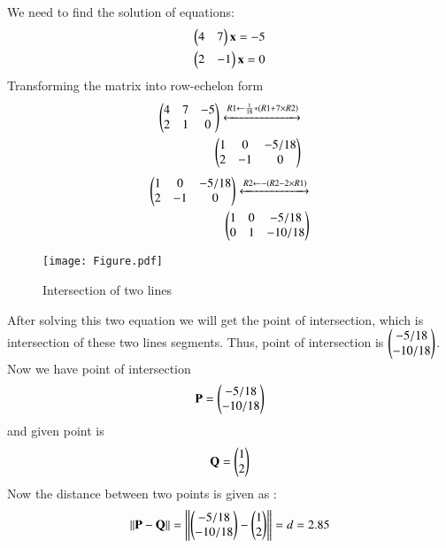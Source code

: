 \documentclass[journal,12pt,twocolumn]{IEEEtran}
\begin{document}
\begin{flushleft}
	We need to find the solution of equations:
	\begin{align}
	\begin{pmatrix}4 & 7\end{pmatrix}\textbf{x} = - 5 \label{eqn1} \\
	\begin{pmatrix}2 & - 1\end{pmatrix}\textbf{x} = 0\label{eqn2}
	\end{align}
	Transforming the matrix into row-echelon form \\
	\begin{align}
	\begin{pmatrix}
		4 & 7 & -5 \\
		2 & 1 & 0\\
	\end{pmatrix}
	\xleftrightarrow[]{R1 \leftarrow \frac{1}{18}*(R1+ 7 \times R2) } \nonumber \label{eqn4} \\
	\begin{pmatrix}
		1 & 0 & -5/18 \\
		2 & -1 & 0
	\end{pmatrix}
	\end{align}
	\begin{align}
	\begin{pmatrix}
		1 & 0 & -5/18 \\
		2 & -1 & 0
	\end{pmatrix}
	\xleftrightarrow[]{R2 \leftarrow  -(R2- 2 \times R1) } \nonumber \label{eqn5}  \\
	\begin{pmatrix}
		1 & 0 & -5/18 \\
		0 & 1 & -10/18
	\end{pmatrix}
	\end{align}
\end{flushleft}




\begin{figure}[htb!]	
	\centering	
	\texttt{[image: Figure.pdf]}	
	\caption{Intersection of two lines}
	\label{fig1}	
\end{figure}


After solving this two equation we will get the  point of intersection, which is intersection of these two lines segments.
Thus, point of intersection is $\begin{pmatrix}-5/18 \\ -10/18 \\ \end{pmatrix} $.
Now we have point of intersection
\begin{align}
 \mathbf{P} = 
\begin{pmatrix}
-5/18\\
-10/18 \\	
\end{pmatrix}
\end{align}
and given point is
\begin{align}
\mathbf{Q}   = 
\begin{pmatrix}
1\\
2 \\	
\end{pmatrix} 
\end{align}
Now  the distance between two points is given as :
\begin{align}
\left\lVert
\mathbf{P} - \mathbf{Q}
\right\rVert = 
\left\lVert
\begin{pmatrix}
-5/18\\ 
-10/18 \\
\end{pmatrix}
-  \begin{pmatrix}
1\\ 
2 \\
\end{pmatrix} \right\rVert= d = 2.85 
\end{align}
\end{document}
